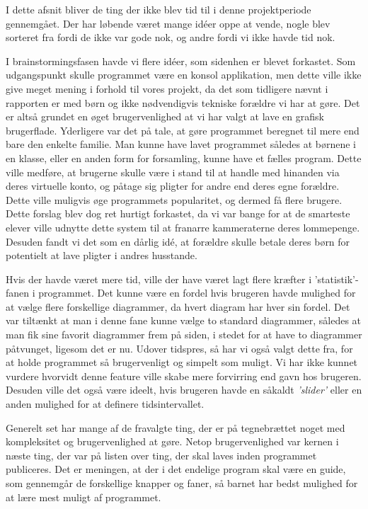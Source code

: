 I dette afsnit bliver de ting der ikke blev tid til i denne projektperiode gennemgået. Der har løbende været mange idéer oppe at vende, nogle blev sorteret fra fordi de ikke var gode nok, og andre fordi vi ikke havde tid nok. 

I brainstormingsfasen havde vi flere idéer, som sidenhen er blevet forkastet. Som udgangspunkt skulle programmet være en konsol applikation, men dette ville ikke give meget mening i forhold til vores projekt, da det som tidligere nævnt i rapporten er med børn og ikke nødvendigvis tekniske forældre vi har at gøre. Det er altså grundet en øget brugervenlighed at vi har valgt at lave en grafisk brugerflade. Yderligere var det på tale, at gøre programmet beregnet til mere end bare den enkelte familie. Man kunne have lavet programmet således at børnene i en klasse, eller en anden form for forsamling, kunne have et fælles program. Dette ville medføre, at brugerne skulle være i stand til at handle med hinanden via deres virtuelle konto, og påtage sig pligter for andre end deres egne forældre. Dette ville muligvis øge programmets popularitet, og dermed få flere brugere. Dette forslag blev dog ret hurtigt forkastet, da vi var bange for at de smarteste elever ville udnytte dette system til at franarre kammeraterne deres lommepenge. Desuden fandt vi det som en dårlig idé, at forældre skulle betale deres børn for potentielt at lave pligter i andres husstande.

Hvis der havde været mere tid, ville der have været lagt flere kræfter i 'statistik'-fanen i programmet. Det kunne være en fordel hvis brugeren havde mulighed for at vælge flere forskellige diagrammer, da hvert diagram har hver sin fordel. Det var tiltænkt at man i denne fane kunne vælge to standard diagrammer, således at man fik sine favorit diagrammer frem på siden, i stedet for at have to diagrammer påtvunget, ligesom det er nu. Udover tidspres, så har vi også valgt dette fra, for at holde programmet så brugervenligt og simpelt som muligt. Vi har ikke kunnet vurdere hvorvidt denne feature ville skabe mere forvirring end gavn hos brugeren. Desuden ville det også være ideelt, hvis brugeren havde en såkaldt \textit{'slider'} eller en anden mulighed for at definere tidsintervallet.

Generelt set har mange af de fravalgte ting, der er på tegnebrættet noget med kompleksitet og brugervenlighed at gøre. Netop brugervenlighed var kernen i næste ting, der var på listen over ting, der skal laves inden programmet publiceres. Det er meningen, at der i det endelige program skal være en guide, som gennemgår de forskellige knapper og faner, så barnet har bedst mulighed for at lære mest muligt af programmet.

